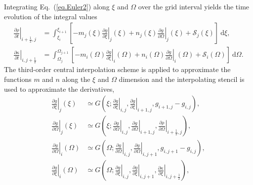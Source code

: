 Integrating Eq.~(\ref{eq.Euler2}) along $\xi$ and $\Omega$ over the grid interval  yields the time evolution of the integral values \cite{imadera2009}
\begin{equation}\label{eq.line}
    \begin{aligned}
    \left.\frac{\partial \rho}{\partial t}\right|_{i+\frac{1}{2},j} &= \int_{\xi_i}^{\xi_{i+1}}[ - m_j(\xi) \left.\frac{\partial g}{\partial \xi}\right|_{j}(\xi) + n_j(\xi) \left.\frac{\partial g}{\partial \Omega}\right|_{j}(\xi) + \mathcal{S}_j(\xi)]~\mathrm{d} \xi,
    \\
    \left.\frac{\partial \kappa}{\partial t}\right|_{i,j+\frac{1}{2}}
    &= \int_{\Omega_j}^{\Omega_{j+1}}[ - m_i(\Omega) \left.\frac{\partial g}{\partial \xi}\right|_{i}(\Omega) + n_i(\Omega) \left.\frac{\partial g}{\partial \Omega}\right|_{i}(\Omega) + \mathcal{S}_i(\Omega)]~\mathrm{d} \Omega.
    \end{aligned}
\end{equation}
The third-order central interpolation scheme is applied to approximate the functions $m$ and $n$ along the $\xi$ and $\Omega$ dimension and the interpolating stencil is used to approximate the derivatives, 
\begin{equation}
    \begin{aligned}
       \left.\frac{\partial g}{\partial \xi}\right|_{j}(\xi)
        &\simeq G\left(\xi;\left.\frac{\partial g}{\partial \xi}\right|_{i,j},\left.\frac{\partial g}{\partial \xi}\right|_{i+1,j},g_{i+1,j}-g_{i,j}\right),
        \\
        \left.\frac{\partial g}{\partial \Omega}\right|_{j}(\xi)
         &\simeq G\left(\xi;\left.\frac{\partial g}{\partial \Omega}\right|_{i,j},\left.\frac{\partial g}{\partial \Omega}\right|_{i+1,j},    \left.\frac{\partial \rho}{\partial \Omega}\right|_{i+\frac{1}{2},j}\right),
         \\
         \left.\frac{\partial g}{\partial \Omega}\right|_{i}(\Omega) 
     &\simeq G\left(\Omega;\left.\frac{\partial g}{\partial \Omega}\right|_{i,j},\left.\frac{\partial g}{\partial \Omega}\right|_{i,j+1},g_{i,j+1}-g_{i,j}\right),\\
         \left.\frac{\partial g}{\partial \xi}\right|_{i}(\Omega) 
  &\simeq G\left(\Omega;\left.\frac{\partial g}{\partial \xi}\right|_{i,j},\left.\frac{\partial g}{\partial \xi}\right|_{i,j+1},\left.\frac{\partial \kappa}{\partial \xi}\right|_{i,j+\frac{1}{2}}\right),
    \end{aligned}
\end{equation}
